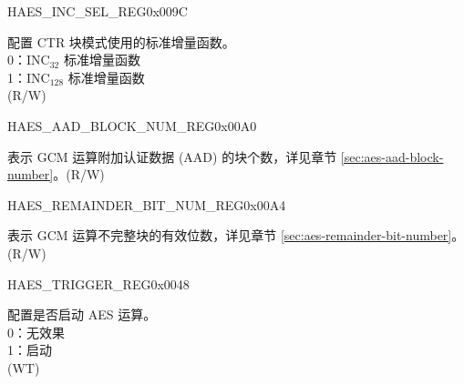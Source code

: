 \begin{register}{H}{AES\_INC\_SEL\_REG}{0x009C}\label{regdesc:AESINCSELREG}
%
%
\regnewline%
\begin{regdesc}\begin{reglist}
\item [AES\_INC\_SEL] 配置 CTR 块模式使用的标准增量函数。\\
0：INC$_{32}$ 标准增量函数\\
1：INC$_{128}$ 标准增量函数\\
(R/W)
\end{reglist}\end{regdesc}
\end{register}


\begin{register}{H}{AES\_AAD\_BLOCK\_NUM\_REG}{0x00A0}\label{regdesc:AESAADBLOCKNUMREG}
%
\regnewline%
\begin{regdesc}\begin{reglist}
\item [AES\_AAD\_BLOCK\_NUM] 表示 GCM 运算附加认证数据 (AAD) 的块个数，详见章节 \ref{sec:aes-aad-block-number}。(R/W)
\end{reglist}\end{regdesc}
\end{register}


\begin{register}{H}{AES\_REMAINDER\_BIT\_NUM\_REG}{0x00A4}\label{regdesc:AESREMAINDERBITNUMREG}
%
%
\regnewline%
\begin{regdesc}\begin{reglist}
\item [AES\_REMAINDER\_BIT\_NUM] 表示 GCM 运算不完整块的有效位数，详见章节 \ref{sec:aes-remainder-bit-number}。(R/W)
\end{reglist}\end{regdesc}
\end{register}


\begin{register}{H}{AES\_TRIGGER\_REG}{0x0048}\label{regdesc:AESTRIGGERREG}
%
%
\regnewline%
\begin{regdesc}\begin{reglist}
\item [AES\_TRIGGER] 配置是否启动 AES 运算。\\
0：无效果\\
1：启动\\
(WT)
\end{reglist}\end{regdesc}
\end{register}


